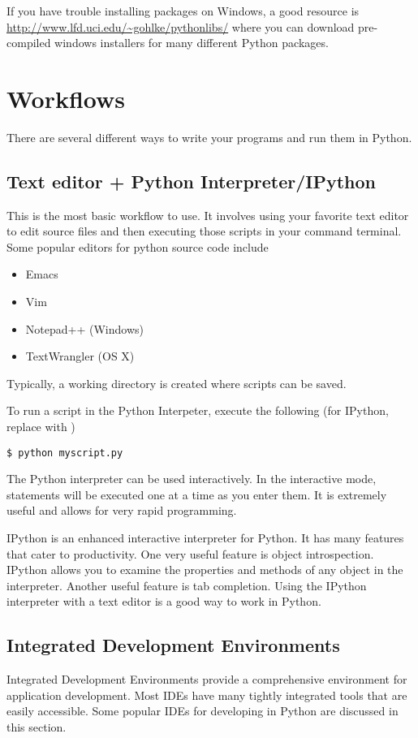 If you have trouble installing packages on Windows, a good resource is \url{http://www.lfd.uci.edu/~gohlke/pythonlibs/} where you can download pre-compiled windows installers for many different Python packages.

\section*{Workflows}
There are several different ways to write your programs and run them in Python.

\subsection*{Text editor + Python Interpreter/IPython}
This is the most basic workflow to use.  
It involves using your favorite text editor to edit source files and then executing those scripts in your command terminal.  
Some popular editors for python source code include
\begin{itemize}
\item Emacs
\item Vim
\item Notepad++ (Windows)
\item TextWrangler (OS X)
\end{itemize}
Typically, a working directory is created where scripts can be saved.

To run a script in the Python Interpeter, execute the following (for IPython, replace  with )
\begin{verbatim}
$ python myscript.py
\end{verbatim}
The Python interpreter can be used interactively. 
In the interactive mode, statements will be executed one at a time as you enter them. 
It is extremely useful and allows for very rapid programming.

IPython is an enhanced interactive interpreter for Python.
It has many features that cater to productivity.
One very useful feature is object introspection.
IPython allows you to examine the properties and methods of any object in the interpreter.
Another useful feature is tab completion.
Using the IPython interpreter with a text editor is a good way to work in Python.

\subsection*{Integrated Development Environments}
Integrated Development Environments provide a comprehensive environment for application development. 
Most IDEs have many tightly integrated tools that are easily accessible. 
Some popular IDEs for developing in Python are discussed in this section.

